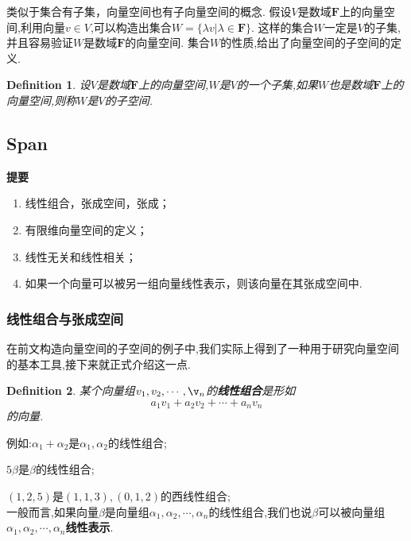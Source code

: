 \documentclass{ctexart}
\newtheorem{definition}{Definition}
\begin{document}
\noindent 类似于集合有子集，向量空间也有子向量空间的概念. 假设$V$是数域$\mathbf{F}$上的向量空间,利用向量$v\in V$,可以构造出集合$W=\{\lambda v|\lambda \in \mathbf{F}\}$. 这样的集合$W$一定是$V$的子集,并且容易验证$W$是数域$\mathbf{F}$的向量空间. 集合$W$的性质,给出了向量空间的子空间的定义.

\begin{definition}
    设$V$是数域$\mathbf{F}$上的向量空间,$W$是$V$的一个子集,如果$W$也是数域$\mathbf{F}$上的向量空间,则称$W$是$V$的子空间.
\end{definition}

\newpage







\subsection{Span}
\textbf{提要}
\begin{enumerate}
    \item 线性组合，张成空间，张成；
    \item 有限维向量空间的定义；
    \item 线性无关和线性相关；
    \item 如果一个向量可以被另一组向量线性表示，则该向量在其张成空间中.\\
\end{enumerate}

\subsubsection{线性组合与张成空间}

\noindent 在前文构造向量空间的子空间的例子中,我们实际上得到了一种用于研究向量空间的基本工具,接下来就正式介绍这一点.

\begin{definition}
    某个向量组$v_1,v_2,\cdots,\v_n$的\textbf{线性组合}是形如
    \[a_1v_1+a_2v_2+\cdots+a_nv_n\]
    的向量.\\
\end{definition}

\noindent 例如:$\alpha_1+\alpha_2$是$\alpha_1,\alpha_2$的线性组合;

$5\beta$是$\beta$的线性组合;

$(1,2,5)$是$(1,1,3),(0,1,2)$的西线性组合;\\

\noindent 一般而言,如果向量$\beta$是向量组$\alpha_1,\alpha_2,\cdots,\alpha_n$的线性组合,我们也说$\beta$可以被向量组$\alpha_1,\alpha_2,\cdots,\alpha_n$\textbf{线性表示}.\\
\end{document}
